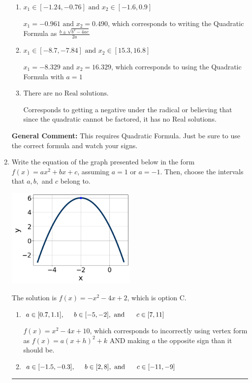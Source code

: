 \documentclass{extbook}[14pt]
\newcommand{\litem}[1]{\item #1

\rule{\textwidth}{0.4pt}}
\begin{document}
\begin{enumerate}
{\begin{enumerate}[label=\Alph*.]
* $x_1 = -0.490 \text{ and } x_2 = 0.961$, which is the correct option.
\item \( x_1 \in [-1.24, -0.76] \text{ and } x_2 \in [-1.6, 0.9] \)

 $x_1 = -0.961 \text{ and } x_2 = 0.490$, which corresponds to writing the Quadratic Formula as $\frac{b \pm \sqrt{b^2 - 4ac}}{2a}$
\item \( x_1 \in [-8.7, -7.84] \text{ and } x_2 \in [15.3, 16.8] \)

 $x_1 = -8.329 \text{ and } x_2 = 16.329$, which corresponds to using the Quadratic Formula with $a=1$
\item \( \text{There are no Real solutions.} \)

Corresponds to getting a negative under the radical or believing that since the quadratic cannot be factored, it has no Real solutions.
\end{enumerate}

\textbf{General Comment:} This requires Quadratic Formula. Just be sure to use the correct formula and watch your signs.
}
\litem{
Write the equation of the graph presented below in the form $f(x)=ax^2+bx+c$, assuming  $a=1$ or $a=-1$. Then, choose the intervals that $a, b,$ and $c$ belong to.

\begin{center}
    \includegraphics[width=0.5\textwidth]{../Figures/quadraticGraphToEquationA.png}
\end{center}


The solution is \( f(x) = -x^{2} -4 x + 2 \), which is option C.\begin{enumerate}[label=\Alph*.]
\item \( a \in [0.7, 1.1], \hspace*{5mm} b \in [-5, -2], \text{ and } \hspace*{5mm} c \in [7, 11] \)

$f(x)=x^{2} -4 x + 10$, which corresponds to incorrectly using vertex form as $f(x) = a(x+h)^2+k$ AND making $a$ the opposite sign than it should be.
\item \( a \in [-1.5, -0.3], \hspace*{5mm} b \in [2, 8], \text{ and } \hspace*{5mm} c \in [-11, -9] \)


\end{enumerate}}
\end{enumerate}
\end{document}
